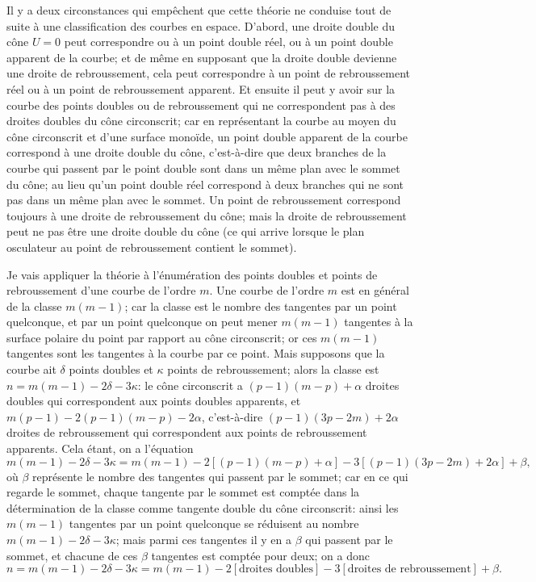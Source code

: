 \documentclass[11pt,a4paper]{article}
\begin{document}
Il y a deux circonstances qui emp\^{e}chent que cette th\'{e}orie ne conduise tout de suite \`{a} une classification des courbes en espace. D'abord, une droite double du c\^{o}ne $U = 0$ peut correspondre ou \`{a} un point double r\'{e}el, ou \`{a} un point double apparent de la courbe; et de m\^{e}me en supposant que la droite double devienne une droite de rebroussement, cela peut correspondre \`{a} un point de rebroussement r\'{e}el ou \`{a} un point de rebroussement apparent. Et ensuite il peut y avoir sur la courbe des points doubles ou de rebroussement qui ne correspondent pas \`{a} des droites doubles du c\^{o}ne circonscrit; car en repr\'{e}sentant la courbe au moyen du c\^{o}ne circonscrit et d'une surface mono\"{i}de, un point double apparent de la courbe correspond \`{a} une droite double du c\^{o}ne, c'est-\`{a}-dire que deux branches de la courbe qui passent par le point double sont dans un m\^{e}me plan avec le sommet du c\^{o}ne; au lieu qu'un point double r\'{e}el correspond \`{a} deux branches qui ne sont pas dans un m\^{e}me plan avec le sommet. Un point de rebroussement correspond toujours \`{a} une droite de rebroussement du c\^{o}ne; mais la droite de rebroussement peut ne pas \^{e}tre une droite double du c\^{o}ne (ce qui arrive lorsque le plan osculateur au point de rebroussement contient le sommet).

\clearpage

Je vais appliquer la th\'{e}orie \`{a} l'\'{e}num\'{e}ration des points doubles et points de rebroussement d'une courbe de l'ordre $m$. Une courbe de l'ordre $m$ est en g\'{e}n\'{e}ral de la classe $m(m-1)$; car la classe est le nombre des tangentes par un point quelconque, et par un point quelconque on peut mener $m(m-1)$ tangentes \`{a} la surface polaire du point par rapport au c\^{o}ne circonscrit; or ces $m(m-1)$ tangentes sont les tangentes \`{a} la courbe par ce point. Mais supposons que la courbe ait $\delta$ points doubles et $\kappa$ points de rebroussement; alors la classe est $n = m(m-1) - 2\delta - 3\kappa$: le c\^{o}ne circonscrit a $(p-1)(m-p) + \alpha$ droites doubles qui correspondent aux points doubles apparents, et $m(p-1) - 2(p-1)(m-p) - 2\alpha$, c'est-\`{a}-dire $(p-1)(3p - 2m) + 2\alpha$ droites de rebroussement qui correspondent aux points de rebroussement apparents. Cela \'{e}tant, on a l'\'{e}quation
\[
m(m-1) - 2\delta - 3\kappa = m(m-1) - 2[(p-1)(m-p) + \alpha] - 3[(p-1)(3p-2m) + 2\alpha] + \beta,
\]
o\`{u} $\beta$ repr\'{e}sente le nombre des tangentes qui passent par le sommet; car en ce qui regarde le sommet, chaque tangente par le sommet est compt\'{e}e dans la d\'{e}termination de la classe comme tangente double du c\^{o}ne circonscrit: ainsi les $m(m-1)$ tangentes par un point quelconque se r\'{e}duisent au nombre $m(m-1) - 2\delta - 3\kappa$; mais parmi ces tangentes il y en a $\beta$ qui passent par le sommet, et chacune de ces $\beta$ tangentes est compt\'{e}e pour deux; on a donc
\[
n = m(m-1) - 2\delta - 3\kappa = m(m-1) - 2[\text{droites doubles}] - 3[\text{droites de rebroussement}] + \beta.
\]
\end{document}
